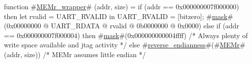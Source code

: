 function #\hyperref[sailMIPSzMEMrzywrapper]{MEMr\_wrapper}# (addr, size) =
    if (addr == 0x000000007f000000) then
      {
        let rvalid = UART_RVALID in
        {
          UART_RVALID = [bitzero];
          #\hyperref[sailMIPSzmask]{mask}#(0x00000000 @ UART_RDATA @ rvalid @ 0b0000000 @ 0x0000)
        }
      }
    else if (addr == 0x000000007f000004) then
      #\hyperref[sailMIPSzmask]{mask}#(0x000000000004ffff) /* Always plenty of write space available and jtag activity */
    else
      #\hyperref[sailMIPSzreversezyendianness]{reverse\_endianness}#(#\hyperref[sailMIPSzMEMr]{MEMr}#(addr, size)) /* MEMr assumes little endian */
